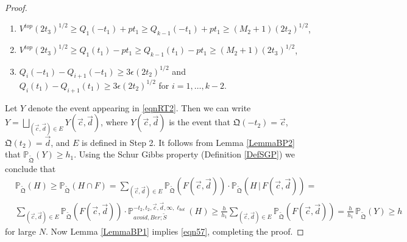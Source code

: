 \begin{proof}
	\begin{enumerate}
		\item $V^{top} (2t_3)^{1/2} \geq Q_1(-t_1) + p t_1 \geq Q_{k-1}(-t_1) + pt_1 \geq (M_2 + 1) (2t_2)^{1/2}$,
		\item $V^{top} (2t_3)^{1/2} \geq Q_1(t_1) - p t_1 \geq Q_{k-1}(t_1) - pt_1 \geq (M_2 + 1) (2t_3)^{1/2}$,
		\item $Q_i(-t_1) - Q_{i+1}(-t_1) \geq 3\epsilon (2t_2)^{1/2}$ and $Q_i(t_1) - Q_{i+1}(t_1)  \geq 3 \epsilon (2t_2)^{1/2}$ for $i = 1, \dots, k-2$.
	\end{enumerate}
	Let $Y$ denote the event appearing in \eqref{eqnRT2}. Then we can write $Y = \bigsqcup_{(\vec{c},\vec{d})\in E} Y(\vec{c},\vec{d})$, where $Y(\vec{c},\vec{d})$ is the event that $\mathfrak{Q}(-t_2) = \vec{c}$, $\mathfrak{Q}(t_2) = \vec{d}$, and $E$ is defined in Step 2. It follows from Lemma \ref{LemmaBP2} that $\mathbb{P}_{\tilde{\mathfrak Q}}(Y) \geq h_1$. Using the Schur Gibbs property (Definition \ref{DefSGP}) we conclude that
	\begin{align*}
	&\mathbb{P}_{\tilde{\mathfrak{Q}}}(H) \geq \mathbb{P}_{\tilde{\mathfrak{Q}}}(H\cap F) = \sum_{(\vec{c},\vec{d})\in E} \mathbb{P}_{\tilde{\mathfrak{Q}}}(F(\vec{c},\vec{d}))\cdot \mathbb{P}_{\tilde{\mathfrak{Q}}}(H\,|\,F(\vec{c},\vec{d})) =\\
	&\sum_{(\vec{c},\vec{d})\in E} \mathbb{P}_{\tilde{\mathfrak{Q}}}(F(\vec{c},\vec{d}))\cdot \mathbb{P}^{-t_2,t_2,\vec{c},\vec{d},\infty,\ell_{bot}}_{avoid,Ber;\tilde S}(H) \geq \frac{h}{h_1}\sum_{(\vec{c},\vec{d})\in E} \mathbb{P}_{\tilde{\mathfrak{Q}}}(F(\vec{c},\vec{d})) = \frac{h}{h_1}\,\mathbb{P}_{\tilde{\mathfrak{Q}}}(Y) \geq h
	\end{align*}
	for large $N$. Now Lemma \ref{LemmaBP1} implies \eqref{eqn57}, completing the proof.
\end{proof}